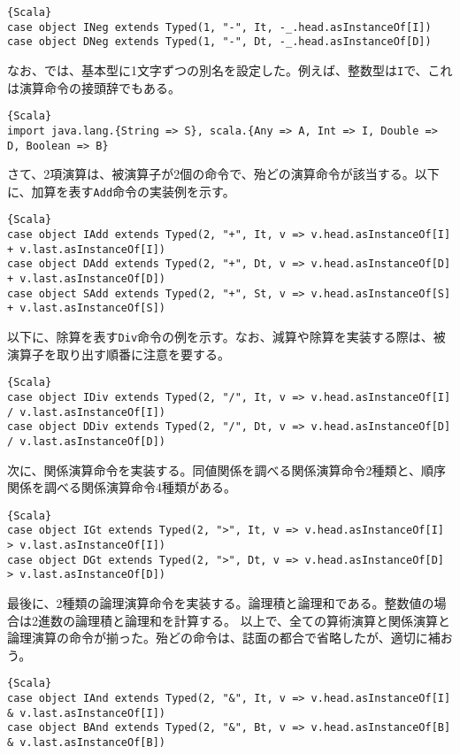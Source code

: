 \documentclass[10pt,a4paper]{book}
\begin{document}
\begin{Verbatim}{Scala}
case object INeg extends Typed(1, "-", It, -_.head.asInstanceOf[I])
case object DNeg extends Typed(1, "-", Dt, -_.head.asInstanceOf[D])
\end{Verbatim}

なお、では、基本型に1文字ずつの別名を設定した。例えば、整数型は\texttt{I}で、これは演算命令の接頭辞でもある。

\begin{Verbatim}{Scala}
import java.lang.{String => S}, scala.{Any => A, Int => I, Double => D, Boolean => B}
\end{Verbatim}

さて、2項演算は、被演算子が2個の命令で、殆どの演算命令が該当する。以下に、加算を表す\texttt{Add}命令の実装例を示す。

\begin{Verbatim}{Scala}
case object IAdd extends Typed(2, "+", It, v => v.head.asInstanceOf[I] + v.last.asInstanceOf[I])
case object DAdd extends Typed(2, "+", Dt, v => v.head.asInstanceOf[D] + v.last.asInstanceOf[D])
case object SAdd extends Typed(2, "+", St, v => v.head.asInstanceOf[S] + v.last.asInstanceOf[S])
\end{Verbatim}

以下に、除算を表す\texttt{Div}命令の例を示す。なお、減算や除算を実装する際は、被演算子を取り出す順番に注意を要する。

\begin{Verbatim}{Scala}
case object IDiv extends Typed(2, "/", It, v => v.head.asInstanceOf[I] / v.last.asInstanceOf[I])
case object DDiv extends Typed(2, "/", Dt, v => v.head.asInstanceOf[D] / v.last.asInstanceOf[D])
\end{Verbatim}

次に、関係演算命令を実装する。同値関係を調べる関係演算命令2種類と、順序関係を調べる関係演算命令4種類がある。

\begin{Verbatim}{Scala}
case object IGt extends Typed(2, ">", It, v => v.head.asInstanceOf[I] > v.last.asInstanceOf[I])
case object DGt extends Typed(2, ">", Dt, v => v.head.asInstanceOf[D] > v.last.asInstanceOf[D])
\end{Verbatim}

最後に、2種類の論理演算命令を実装する。論理積と論理和である。整数値の場合は2進数の論理積と論理和を計算する。
以上で、全ての算術演算と関係演算と論理演算の命令が揃った。殆どの命令は、誌面の都合で省略したが、適切に補おう。

\begin{Verbatim}{Scala}
case object IAnd extends Typed(2, "&", It, v => v.head.asInstanceOf[I] & v.last.asInstanceOf[I])
case object BAnd extends Typed(2, "&", Bt, v => v.head.asInstanceOf[B] & v.last.asInstanceOf[B])
\end{Verbatim}
\end{document}
